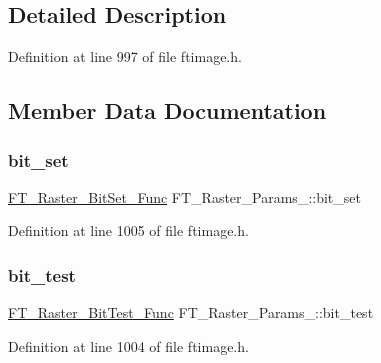 \subsection{Detailed Description}


Definition at line 997 of file ftimage.\+h.



\subsection{Member Data Documentation}
\mbox{\label{struct_f_t___raster___params___ac66c3c44fcb63c254a46170d85d653c0}} 
\subsubsection{\texorpdfstring{bit\_set}{bit\_set}}
{\footnotesize\ttfamily \mbox{\hyperlink{ftimage_8h_a715e9f91407a9758dbefb6dd6549fe35}{F\+T\+\_\+\+Raster\+\_\+\+Bit\+Set\+\_\+\+Func}} F\+T\+\_\+\+Raster\+\_\+\+Params\+\_\+\+::bit\+\_\+set}



Definition at line 1005 of file ftimage.\+h.

\mbox{\label{struct_f_t___raster___params___aff3c1a2a7eda24136a46715128d24ed6}} 
\subsubsection{\texorpdfstring{bit\_test}{bit\_test}}
{\footnotesize\ttfamily \mbox{\hyperlink{ftimage_8h_a2ac5897dab423a944f4457a3131061e4}{F\+T\+\_\+\+Raster\+\_\+\+Bit\+Test\+\_\+\+Func}} F\+T\+\_\+\+Raster\+\_\+\+Params\+\_\+\+::bit\+\_\+test}



Definition at line 1004 of file ftimage.\+h.

\mbox{\label{struct_f_t___raster___params___a42c30e60ad5e243cf78833232e052b47}} 
